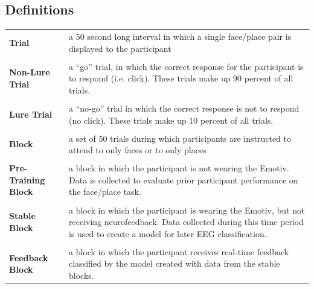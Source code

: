 \documentclass[11pt]{report}
\begin{document}
\subsection{Definitions}
\begin{table}[h]
\begin{tabular}{p{4cm}|p{10cm}}
\textbf{Trial}  & a 50 second long interval in which a single face/place pair is displayed to the participant  \\
\\
\textbf{Non-Lure Trial} & a “go” trial, in which the correct response for the participant is to respond (i.e. click).  These trials make up 90 percent of all trials.\\
\\
\textbf{Lure Trial}  & a “no-go” trial in which the correct response is not to respond (no click).  These trials make up 10 percent of all trials.\\
\\
\textbf{Block} & a set of 50 trials during which participants are instructed to attend to only faces or to only places\\
\\
\textbf{Pre-Training Block}  & a block in which the participant is not wearing the Emotiv.  Data is collected to evaluate prior participant performance on the face/place task. \\
\\
\textbf{Stable Block} & a block in which the participant is wearing the Emotiv, but not receiving neurofeedback.  Data collected during this time period is used to create a model for later EEG classification.\\
\\
\textbf{Feedback Block} & a block in which the participant receives real-time feedback classified by the model created with data from the stable blocks.
\end{tabular}
\end{table}
\end{document}

